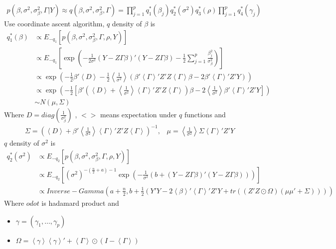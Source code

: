 \documentclass[11pt]{article}
\begin{document}
	
	\begin{align*}
	p(\beta,\sigma^2,\sigma_\beta^2,\Gamma | Y) \approx q(\beta,\sigma^2,\sigma_\beta^2,\Gamma) = \prod_{j=1}^{p}q_1^*(\beta_j)q_2^*(\sigma^2) q_3^*(\rho)\prod_{j=1}^{p}q_4^*(\gamma_j)
	\end{align*}
	Use coordinate ascent algorithm, $q$ density of $\beta$ is
	\begin{align*}
	q_1^*(\beta) &\propto E_{-q_1}\left[p(\beta,\sigma^2,\sigma_\beta^2,\Gamma , \rho,Y)\right]\\
	&\propto E_{-q_1}\left[\exp\left(-\frac{1}{2\sigma^2}\left(Y - Z\Gamma\beta\right)'\left(Y-Z\Gamma\beta\right) - \frac{1}{2}\sum_{j=1}^{p}\frac{\beta_j^2}{\sigma_{\beta}^2}\right)\right]\\
	&\propto \exp\left(-\frac{1}{2} \beta'\left<D\right> -\frac{1}{2}\left<\frac{1}{\sigma^2}\right>\left(\beta'\left<\Gamma\right>'Z'Z\left<\Gamma\right>\beta- 2\beta'\left<\Gamma\right>'Z'Y\right)\right)\\
	&\propto \exp\left(-\frac{1}{2}\left[\beta'\left(\left<D\right> + \left<\frac{1}{\sigma^2}\right>\left<\Gamma\right>'Z'Z\left<\Gamma\right>\right)\beta -2 \left<\frac{1}{\sigma^2}\right>\beta'\left<\Gamma\right>'Z'Y\right]\right)\\
	&\sim N(\mu,\Sigma)
	\end{align*}
	Where $D = diag(\frac{1}{\sigma_{\beta}^2})$ , $<>$ means expectation under $q$ functions and
	\begin{align*}
	\Sigma = \left(\left<D\right> +\beta' \left<\frac{1}{\sigma^2}\right>\left<\Gamma\right>'Z'Z\left<\Gamma\right>\right)^{-1},\;\;\;\mu = \left<\frac{1}{\sigma^2}\right> \Sigma  \left<\Gamma\right>'Z'Y
	\end{align*}
	$q$ density of $\sigma^2$ is
	\begin{align*}
	q_2^*(\sigma^2) &\propto E_{-q_2}\left[p(\beta,\sigma^2,\sigma_\beta^2,\Gamma, \rho , Y)\right]\\
	&\propto E_{-q_2}\left[\left(\sigma^2\right)^{-\left(\frac{n}{2}+a\right)-1}\exp \left(-\frac{1}{\sigma^2}\left(b+\left(Y-Z\Gamma\beta\right)'\left(Y-Z\Gamma\beta\right)\right)\right) \right]\\
	&\propto Inverse-Gamma\left(a+\frac{n}{2}, b+\frac{1}{2}\left(Y'Y - 2\left<\beta\right>'\left<\Gamma\right>'Z'Y + tr\left(\left(Z'Z \odot \Omega\right)\left(\mu \mu'+ \Sigma\right)\right) \right)\right)
	\end{align*}
	Where $odot$ is hadamard product and
	\begin{itemize}
		\item $\gamma = (\gamma_1,\dots,\gamma_p)$
		\item $\Omega = \left<\gamma\right>\left<\gamma\right>' + \left<\Gamma\right>\odot(I - \left<\Gamma\right>)$
	\end{itemize}
\end{document}
